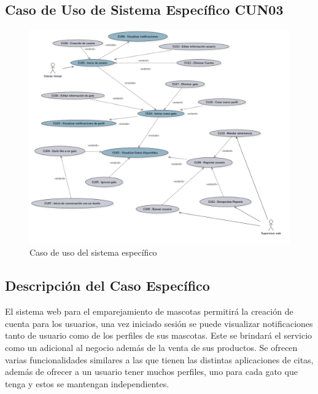 \documentclass{article}
\begin{document}
\subsection{Caso de Uso de Sistema Específico CUN03}
\vspace{5mm}
\begin{figure}[h]
    \begin{center}
        \includegraphics[width=\textwidth]{images/Caso de uso especifico.png}
        \caption{Caso de uso del sistema específico}
    \end{center}
\end{figure}
\subsection{Descripción del Caso Específico}
El sistema web para el emparejamiento de mascotas permitirá la creación de cuenta para los usuarios, una vez iniciado sesión se puede visualizar notificaciones tanto de usuario como de los perfiles de sus mascotas.
Este se brindará el servicio como un adicional al negocio además de la venta de sus productos. Se ofrecen varias funcionalidades similares a las que tienen las distintas aplicaciones de citas, además de ofrecer a un usuario tener muchos perfiles, uno para cada gato que tenga y estos se mantengan independientes.
\clearpage

\end{document}
